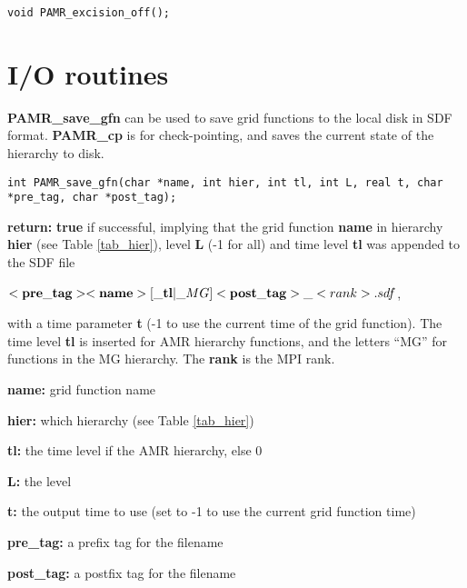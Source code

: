 \documentclass[aps,amssymb,unsortedaddress,nofootinbib]{revtex4}
\def\lsep{\itemsep 0.05in}
\begin{document}

\begin{verbatim}
void PAMR_excision_off();
\end{verbatim}


\section{I/O routines}

{\bf PAMR\_save\_gfn} can be used to save grid functions to the local disk in SDF 
\cite{rnpl} format. {\bf PAMR\_cp} is for check-pointing, and saves
the current state of the hierarchy to disk.

\begin{verbatim}
int PAMR_save_gfn(char *name, int hier, int tl, int L, real t, char *pre_tag, char *post_tag);
\end{verbatim}
\begin{list}{}{\lsep}
\item {\bf return:} {\bf true} if successful, implying that the grid function {\bf name}
                               in hierarchy {\bf hier} (see Table \ref{tab_hier}), 
                               level {\bf L} (-1 for all) and time level {\bf tl}
                               was appended to the SDF file 

                               $<{\bf pre\_tag}><{\bf name}>[\_{\bf tl}|\_MG]<{\bf post\_tag}>\_<rank>.sdf$,

                               with a time parameter {\bf t} (-1 to use the current time of 
                               the grid function). The time level {\bf tl} is inserted for
                               AMR hierarchy functions, and the letters ``MG'' for functions
                               in the MG hierarchy. The {\bf rank} is the MPI rank.

\item {\bf *name:} grid function name
\item {\bf hier:} which hierarchy (see Table \ref{tab_hier})
\item {\bf tl:} the time level if the AMR hierarchy, else 0
\item {\bf L:} the level 
\item {\bf t:} the output time to use (set to -1 to use the current grid function time)
\item {\bf *pre\_tag:} a prefix tag for the filename
\item {\bf *post\_tag:} a postfix tag for the filename
\end{list}
\end{document}

